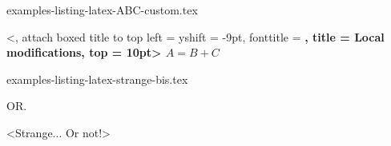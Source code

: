 \begin{filecontents*}[overwrite]{examples-listing-latex-ABC-custom.tex}
\begin{tdoclatex}%
    [linenos, style = igor, showspaces]%
    <,
     attach boxed title to top left = {yshift = -9pt},
     fonttitle                      = \bfseries,
     title                          = Local modifications,
     top                            = 10pt>
$A = B + C$
\end{tdoclatex}
\end{filecontents*}


\begin{filecontents*}[overwrite]{examples-listing-latex-strange-bis.tex}
\begin{tdoclatex}
\end{tdoclatex}
OR.
\begin{tdoclatex}
\string<Strange... Or not!>
\end{tdoclatex}
\end{filecontents*}



\documentclass{tutodoc}

\usepackage[T1]{fontenc}

\usepackage[english]{babel, varioref}

\usepackage{enumitem}
\usepackage{fmtcount}

\usepackage{multicol}
\usepackage{tasks}

\usepackage{pdfpages}

\setlength{\parindent}{0em}

\newcommand\thisproj{\tdoccls{tutodoc}}
\newcommand\thisrepo{\url{https://github.com/bc-tools/for-latex/tree/tutodoc}}
\newcommand\thismonorepo{\url{https://github.com/bc-tools/for-latex}}


\newcommand\ctan{\href{https://ctan.org/}{\trademark{CTAN}}}
\newcommand\git{\trademark{git}}
\newcommand\pdf{\trademark{PDF}}

\newcommand\brainfuck{\trademark{Brainfuck}}
\newcommand\lua{\trademark{Lua}}
\newcommand\perl{\trademark{Perl}}
\newcommand\python{\trademark{Python}}

\newcommand\pygmentsREF{\href{https://pygments.org/}{Pygments}}


